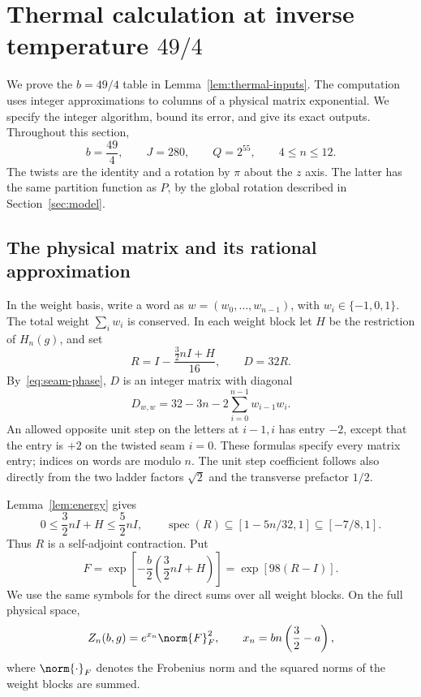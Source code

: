 \section{Thermal calculation at inverse temperature \texorpdfstring{$49/4$}{49/4}}
\label{sec:thermal72}

We prove the $b=49/4$ table in Lemma~\ref{lem:thermal-inputs}. The computation
uses integer approximations to columns of a physical matrix exponential.
We specify the integer algorithm, bound its error, and give its exact
outputs. Throughout this section,
\[
 b=\frac{49}{4},\qquad J=280,\qquad Q=2^{55},\qquad 4\le n\le12.
\]
The twists are the identity and a rotation by \(\pi\) about the \(z\) axis.
The latter has the same partition function as \(P\), by the global rotation
described in Section~\ref{sec:model}.

\subsection{The physical matrix and its rational approximation}

In the weight basis, write a word as \(w=(w_0,\ldots,w_{n-1})\), with
\(w_i\in\{-1,0,1\}\). The total weight \(\sum_iw_i\) is conserved.
In each weight block let \(H\) be the restriction of \(H_n(g)\), and set
\begin{equation}\label{eq:thermal72-matrix}
 R=I-\frac{\frac32nI+H}{16},\qquad D=32R.
\end{equation}
By~\eqref{eq:seam-phase}, \(D\) is an integer matrix with diagonal
\[
 D_{w,w}=32-3n-2\sum_{i=0}^{n-1}w_{i-1}w_i.
\]
An allowed opposite unit step on the letters at \(i-1,i\) has entry
\(-2\), except that the entry is \(+2\) on the twisted seam \(i=0\).
These formulas specify every matrix entry; indices on words are modulo
\(n\). The unit step coefficient follows also directly from the two
ladder factors \(\sqrt2\) and the transverse prefactor \(1/2\).

Lemma~\ref{lem:energy} gives
\[
 0\le \frac32nI+H\le\frac52nI,\qquad
 \operatorname{spec}(R)\subseteq[1-5n/32,1]\subseteq[-7/8,1].
\]
Thus \(R\) is a self-adjoint contraction. Put
\[
 F=\exp\!\left[-\frac b2\left(\frac32nI+H\right)\right]
   =\exp[98(R-I)].
\]
We use the same symbols for the direct sums over all weight blocks.
On the full physical space,
\begin{equation}\label{eq:thermal72-trace}
 Z_n(b,g)=e^{x_n}\norm{F}_F^2,\qquad
 x_n=bn\left(\frac32-a\right),
\end{equation}
where \(\norm{\cdot}_F\) denotes the Frobenius norm and the squared norms
of the weight blocks are summed.

